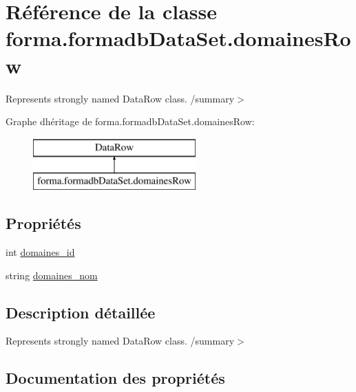 \hypertarget{classforma_1_1formadb_data_set_1_1domaines_row}{}\section{Référence de la classe forma.\+formadb\+Data\+Set.\+domaines\+Row}
\label{classforma_1_1formadb_data_set_1_1domaines_row}


Represents strongly named Data\+Row class. /summary$>$  


Graphe d\textquotesingle{}héritage de forma.\+formadb\+Data\+Set.\+domaines\+Row\+:\begin{figure}[H]
\begin{center}
\leavevmode
\includegraphics[height=2.000000cm]{classforma_1_1formadb_data_set_1_1domaines_row}
\end{center}
\end{figure}
\subsection*{Propriétés}
\begin{DoxyCompactItemize}
\item 
int \hyperlink{classforma_1_1formadb_data_set_1_1domaines_row_adf854bbaabea4c6e85c637435f46512d}{domaines\+\_\+id}
\item 
string \hyperlink{classforma_1_1formadb_data_set_1_1domaines_row_a87dd29f848c8e28d70736628b0ab9a04}{domaines\+\_\+nom}
\end{DoxyCompactItemize}


\subsection{Description détaillée}
Represents strongly named Data\+Row class. /summary$>$ 

\subsection{Documentation des propriétés}
